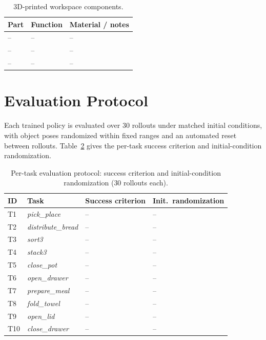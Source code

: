 \documentclass{article}
\begin{document}
\begin{table}[h]
\centering
\caption{3D-printed workspace components.}
\label{tab:workspace}
\small
\setlength{\tabcolsep}{6pt}
\begin{tabular}{lll}
\toprule
\textbf{Part} & \textbf{Function} & \textbf{Material / notes} \\
\midrule
-- & -- & -- \\
-- & -- & -- \\
-- & -- & -- \\
\bottomrule
\end{tabular}
\end{table}

\section{Evaluation Protocol}
\label{app:evalproto}

Each trained policy is evaluated over $30$ rollouts under matched initial
conditions, with object poses randomized within fixed ranges and an automated
reset between rollouts. Table~\ref{tab:evalproto} gives the per-task success
criterion and initial-condition randomization.

\begin{table}[h]
\centering
\caption{Per-task evaluation protocol: success criterion and initial-condition randomization ($30$ rollouts each).}
\label{tab:evalproto}
\small
\setlength{\tabcolsep}{6pt}
\begin{tabular}{llll}
\toprule
\textbf{ID} & \textbf{Task} & \textbf{Success criterion} & \textbf{Init.\ randomization} \\
\midrule
T1  & \textit{pick\_place}       & -- & -- \\
T2  & \textit{distribute\_bread} & -- & -- \\
T3  & \textit{sort3}             & -- & -- \\
T4  & \textit{stack3}            & -- & -- \\
T5  & \textit{close\_pot}        & -- & -- \\
T6  & \textit{open\_drawer}      & -- & -- \\
T7  & \textit{prepare\_meal}     & -- & -- \\
T8  & \textit{fold\_towel}       & -- & -- \\
T9  & \textit{open\_lid}         & -- & -- \\
T10 & \textit{close\_drawer}     & -- & -- \\
\bottomrule
\end{tabular}
\end{table}
\end{document}
